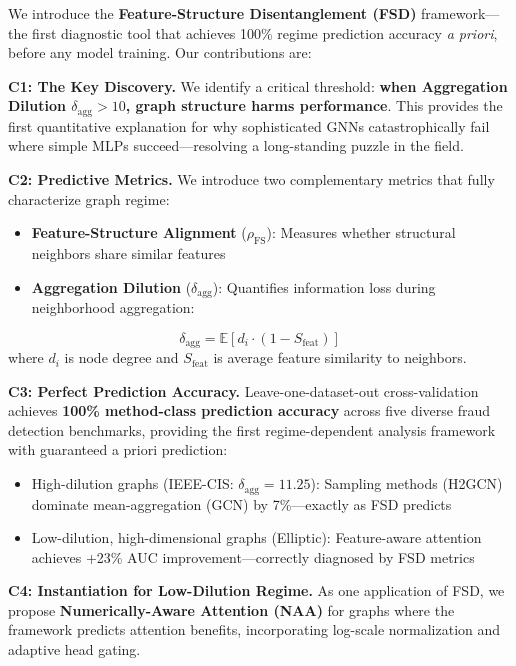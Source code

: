 We introduce the \textbf{Feature-Structure Disentanglement (FSD)} framework---the first diagnostic tool that achieves 100\% regime prediction accuracy \textit{a priori}, before any model training. Our contributions are:

\textbf{C1: The Key Discovery.} We identify a critical threshold: \textbf{when Aggregation Dilution $\delta_{\text{agg}} > 10$, graph structure harms performance}. This provides the first quantitative explanation for why sophisticated GNNs catastrophically fail where simple MLPs succeed---resolving a long-standing puzzle in the field.

\textbf{C2: Predictive Metrics.} We introduce two complementary metrics that fully characterize graph regime:
\begin{itemize}
    \item \textbf{Feature-Structure Alignment} ($\rho_{\text{FS}}$): Measures whether structural neighbors share similar features
    \item \textbf{Aggregation Dilution} ($\delta_{\text{agg}}$): Quantifies information loss during neighborhood aggregation:
\end{itemize}
\begin{equation}
\delta_{\text{agg}} = \mathbb{E}[d_i \cdot (1 - S_{\text{feat}})]
\end{equation}
where $d_i$ is node degree and $S_{\text{feat}}$ is average feature similarity to neighbors.

\textbf{C3: Perfect Prediction Accuracy.} Leave-one-dataset-out cross-validation achieves \textbf{100\% method-class prediction accuracy} across five diverse fraud detection benchmarks, providing the first regime-dependent analysis framework with guaranteed a priori prediction:
\begin{itemize}
    \item High-dilution graphs (IEEE-CIS: $\delta_{\text{agg}}{=}11.25$): Sampling methods (H2GCN) dominate mean-aggregation (GCN) by 7\%---exactly as FSD predicts
    \item Low-dilution, high-dimensional graphs (Elliptic): Feature-aware attention achieves +23\% AUC improvement---correctly diagnosed by FSD metrics
\end{itemize}

\textbf{C4: Instantiation for Low-Dilution Regime.} As one application of FSD, we propose \textbf{Numerically-Aware Attention (NAA)} for graphs where the framework predicts attention benefits, incorporating log-scale normalization and adaptive head gating.


